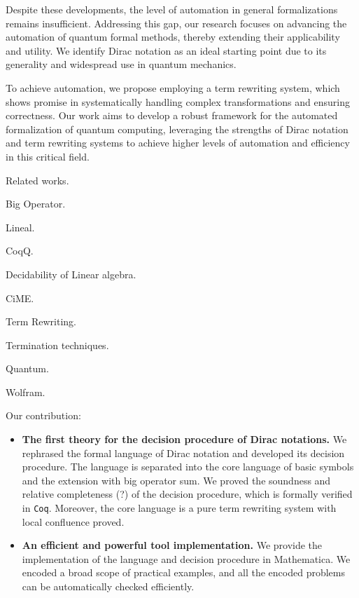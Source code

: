 Despite these developments, the level of automation in general formalizations remains insufficient. Addressing this gap, our research focuses on advancing the automation of quantum formal methods, thereby extending their applicability and utility. We identify Dirac notation as an ideal starting point due to its generality and widespread use in quantum mechanics.

To achieve automation, we propose employing a term rewriting system, which shows promise in systematically handling complex transformations and ensuring correctness. Our work aims to develop a robust framework for the automated formalization of quantum computing, leveraging the strengths of Dirac notation and term rewriting systems to achieve higher levels of automation and efficiency in this critical field.


Related works.

Big Operator.\cite{Bertot2008}

Lineal.\cite{Arrighi2017}

CoqQ.\cite{Zhou2022}

Decidability of Linear algebra.\cite{Solovay2012}

CiME.\cite{Contejean2011}

Term Rewriting. \cite{Baader1998}

Termination techniques. \cite{Arts2000} \cite{Giesl2002} \cite{Giesl2006}

Quantum. \cite{Nielsen2010}

Wolfram. \cite{WolframLanguage}

\vspace{2em}

Our contribution:
\begin{itemize}
  \item \textbf{The first theory for the decision procedure of Dirac notations.} 
  We rephrased the formal language of Dirac notation and developed its decision procedure. The language is separated into the core language of basic symbols and the extension with big operator sum. We proved the soundness and relative completeness (?) of the decision procedure, which is formally verified in \texttt{Coq}. Moreover, the core language is a pure term rewriting system with local confluence proved.
  \item \textbf{An efficient and powerful tool implementation.}
  We provide the implementation of the language and decision procedure in Mathematica. We encoded a broad scope of practical examples, and all the encoded problems can be automatically checked efficiently.
\end{itemize}
